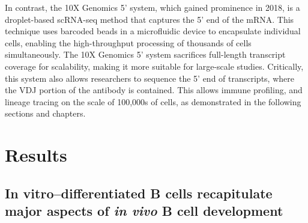 In contrast, the 10X Genomics 5' system, which gained prominence in 2018, is a droplet-based scRNA-seq method that captures the 5' end of the mRNA. This technique uses barcoded beads in a microfluidic device to encapsulate individual cells, enabling the high-throughput processing of thousands of cells simultaneously. The 10X Genomics 5' system sacrifices full-length transcript coverage for scalability, making it more suitable for large-scale studies. Critically, this system also allows researchers to sequence the 5' end of transcripts, where the VDJ portion of the antibody is contained. This allows immune profiling, and lineage tracing on the scale of 100,000s of cells, as demonstrated in the following sections and chapters. 

\section{Results}

\subsection{In vitro–differentiated B cells recapitulate major aspects of \textit{in vivo} B cell development}

